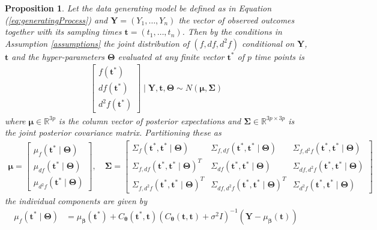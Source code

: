 \documentclass[
  11pt,
]{article}
\newtheorem{proposition}{Proposition}
\theoremstyle{nonumberplain}
\begin{document}
\begin{proposition}
Let the data generating model be defined as in Equation (\ref{eq:generatingProcess}) and $\mathbf{Y} = (Y_1, \ldots, Y_n)$ the vector of observed outcomes together with its sampling times $\mathbf{t} = (t_1, \ldots, t_n)$. Then by the conditions in Assumption \ref{assumptions} the joint distribution of $(f, df, d^2\!f)$ conditional on $\mathbf{Y}$, $\mathbf{t}$ and the hyper-parameters $\bm{\Theta}$ evaluated at any finite vector $\mathbf{t}^\ast$ of $p$ time points is
\begin{align*}
\begin{bmatrix}f(\mathbf{t}^\ast)\\ df(\mathbf{t}^\ast)\\ d^2\!f(\mathbf{t}^\ast)\end{bmatrix} \mid \mathbf{Y}, \mathbf{t}, \bm{\Theta} \sim N\left(\bm{\mu},  \bm{\Sigma}\right)
\end{align*}
where $\bm{\mu} \in \mathbb{R}^{3p}$ is the column vector of posterior expectations and $\bm{\Sigma} \in \mathbb{R}^{3p \times 3p}$ is the joint posterior covariance matrix. Partitioning these as
\begin{align*}
  \bm{\mu} = \begin{bmatrix}\mu_{f}(\mathbf{t^\ast} \mid \bm{\Theta})\\ \mu_{df}(\mathbf{t^\ast} \mid \bm{\Theta})\\ \mu_{d^2\!f}(\mathbf{t^\ast} \mid \bm{\Theta})\end{bmatrix}, \quad \bm{\Sigma} = \begin{bmatrix}\Sigma_{f}(\mathbf{t^\ast},\mathbf{t^\ast} \mid \bm{\Theta}) &  \Sigma_{f,df}(\mathbf{t^\ast},\mathbf{t^\ast} \mid \bm{\Theta}) & \Sigma_{f,d^2\!f}(\mathbf{t^\ast},\mathbf{t^\ast} \mid \bm{\Theta})\\  \Sigma_{f,df}(\mathbf{t^\ast},\mathbf{t^\ast} \mid \bm{\Theta})^T & \Sigma_{df}(\mathbf{t^\ast},\mathbf{t^\ast} \mid \bm{\Theta}) & \Sigma_{df,d^2\!f}(\mathbf{t^\ast},\mathbf{t^\ast} \mid \bm{\Theta})\\ \Sigma_{f,d^2\!f}(\mathbf{t^\ast}, \mathbf{t^\ast} \mid \bm{\Theta})^T & \Sigma_{df,d^2\!f}(\mathbf{t^\ast}, \mathbf{t^\ast} \mid \bm{\Theta})^T & \Sigma_{d^2\!f}(\mathbf{t^\ast}, \mathbf{t^\ast} \mid \bm{\Theta})\end{bmatrix} 
\end{align*}
the individual components are given by
\begin{align*}
  \mu_{f}(\mathbf{t}^\ast \mid \bm{\Theta}) &= \mu_{\bm{\beta}}(\mathbf{t}^\ast) + C_{\bm{\theta}}(\mathbf{t}^\ast, \mathbf{t})\left(C_{\bm{\theta}}(\mathbf{t}, \mathbf{t}) + \sigma^2 I\right)^{-1}\left(\mathbf{Y} - \mu_{\bm{\beta}}(\mathbf{t})\right)\\

\end{align*}
\end{proposition}
\end{document}
